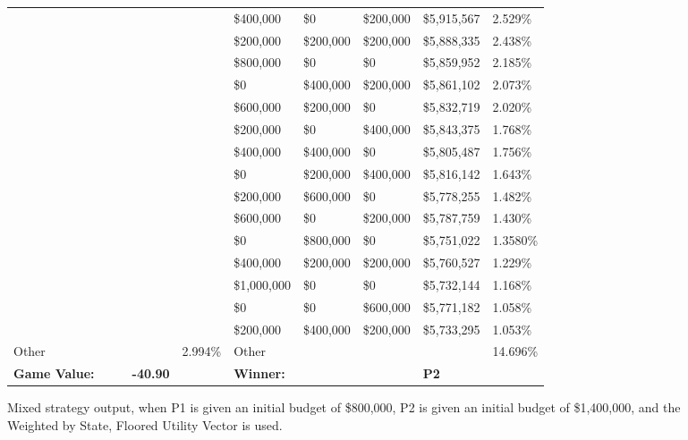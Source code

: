 \documentclass[11pt]{article}
\begin{document}
\begin{figure}
\begin{tabular}{ |p{1.0cm}p{1.0cm}p{1.0cm}p{2.0cm}|p{1.0cm}||p{1.0cm}p{1.0cm}p{1.0cm}p{2.0cm}|p{1.0cm}|}
&&&&                                                & \$400,000 & \$0& \$200,000 & \$5,915,567  & 2.529\% \\
&&&&                                                & \$200,000& \$200,000& \$200,000 & \$5,888,335  & 2.438\% \\
&&&&                                                & \$800,000 & \$0 & \$0 & \$5,859,952  & 2.185\% \\
&&&&                                                & \$0& \$400,000& \$200,000 & \$5,861,102  & 2.073\% \\
&&&&                                                & \$600,000& \$200,000 & \$0 & \$5,832,719  & 2.020\% \\
&&&&                                                & \$200,000 & \$0& \$400,000 & \$5,843,375  & 1.768\% \\
&&&&                                                & \$400,000& \$400,000 & \$0 & \$5,805,487  & 1.756\% \\
&&&&                                                & \$0& \$200,000& \$400,000 & \$5,816,142  & 1.643\% \\
&&&&                                                & \$200,000 & \$600,000 & \$0 & \$5,778,255  & 1.482\% \\
&&&&                                                & \$600,000 & \$0& \$200,000 & \$5,787,759  & 1.430\% \\
&&&&                                                & \$0& \$800,000 & \$0 & \$5,751,022  & 1.3580\% \\
&&&&                                                & \$400,000& \$200,000& \$200,000 & \$5,760,527  & 1.229\% \\
&&&&                                                & \$1,000,000 & \$0 & \$0 & \$5,732,144  & 1.168\% \\
&&&&                                                & \$0 & \$0 & \$600,000 & \$5,771,182  & 1.058\% \\
&&&&                                                & \$200,000& \$400,000& \$200,000 & \$5,733,295  & 1.053\% \\
\hline
Other &&&& 2.994\% & Other &&&& 14.696\% \\
\hline
\small \textbf{Game Value:} &&& \small \textbf{-40.90} && \small \textbf{Winner:} &&& \small \textbf{P2}&\\
\hline
\end{tabular}
\caption{Mixed strategy output, when P1 is given an initial budget of \$800,000, P2 is given an initial budget of \$1,400,000, and the Weighted by State, Floored Utility Vector is used.}
\label{8v14table.2}
\end{figure}
\end{document}
